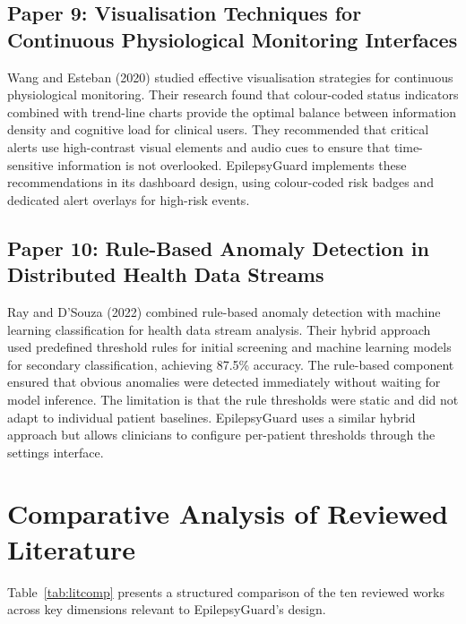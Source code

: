 \documentclass[12pt, a4paper, oneside]{report}
\begin{document}
\subsection{Paper 9: Visualisation Techniques for Continuous Physiological Monitoring Interfaces}

Wang and Esteban (2020) studied effective visualisation strategies for continuous physiological monitoring. Their research found that colour-coded status indicators combined with trend-line charts provide the optimal balance between information density and cognitive load for clinical users. They recommended that critical alerts use high-contrast visual elements and audio cues to ensure that time-sensitive information is not overlooked. EpilepsyGuard implements these recommendations in its dashboard design, using colour-coded risk badges and dedicated alert overlays for high-risk events.

\subsection{Paper 10: Rule-Based Anomaly Detection in Distributed Health Data Streams}

Ray and D'Souza (2022) combined rule-based anomaly detection with machine learning classification for health data stream analysis. Their hybrid approach used predefined threshold rules for initial screening and machine learning models for secondary classification, achieving 87.5\% accuracy. The rule-based component ensured that obvious anomalies were detected immediately without waiting for model inference. The limitation is that the rule thresholds were static and did not adapt to individual patient baselines. EpilepsyGuard uses a similar hybrid approach but allows clinicians to configure per-patient thresholds through the settings interface.

\section{Comparative Analysis of Reviewed Literature}

Table~\ref{tab:litcomp} presents a structured comparison of the ten reviewed works across key dimensions relevant to EpilepsyGuard's design.
\end{document}
